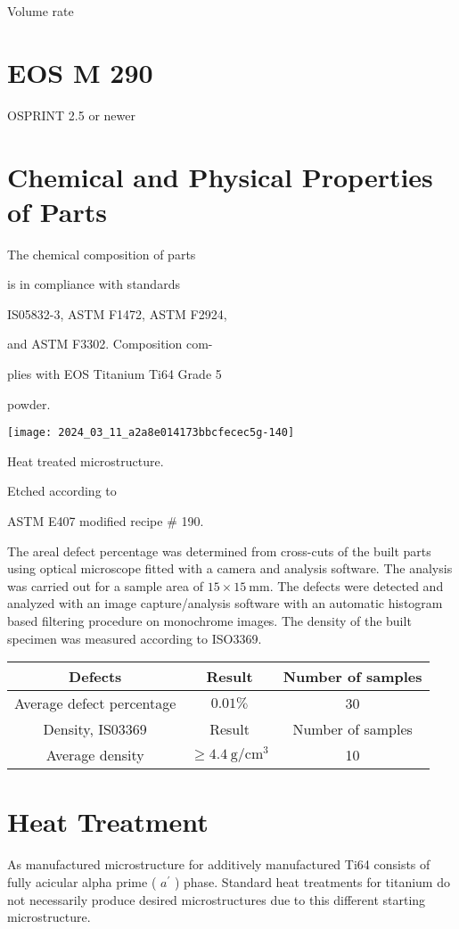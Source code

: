 \documentclass[10pt]{article}
\begin{document}
Volume rate

\section*{EOS M 290}
OSPRINT 2.5 or newer

\section*{Chemical and Physical Properties of Parts}
The chemical composition of parts

is in compliance with standards

IS05832-3, ASTM F1472, ASTM F2924,

and ASTM F3302. Composition com-

plies with EOS Titanium Ti64 Grade 5

powder.

\begin{center}
\texttt{[image: 2024\_03\_11\_a2a8e014173bbcfecec5g-140]}
\end{center}

Heat treated microstructure.

Etched according to

ASTM E407 modified recipe \# 190.

The areal defect percentage was determined from cross-cuts of the built parts using optical microscope fitted with a camera and analysis software. The analysis was carried out for a sample area of $15 \times 15 \mathrm{~mm}$. The defects were detected and analyzed with an image capture/analysis software with an automatic histogram based filtering procedure on monochrome images. The density of the built specimen was measured according to ISO3369.

\begin{center}
\begin{tabular}{|c|c|c|}
\hline
Defects & Result & Number of samples \\
\hline
Average defect percentage & $0.01 \%$ & 30 \\
\hline
Density, IS03369 & Result & Number of samples \\
\hline
Average density & $\geq 4.4 \mathrm{~g} / \mathrm{cm}^{3}$ & 10 \\
\hline
\end{tabular}
\end{center}

\section*{Heat Treatment}
As manufactured microstructure for additively manufactured Ti64 consists of fully acicular alpha prime ( $a^{\prime}$ ) phase. Standard heat treatments for titanium do not necessarily produce desired microstructures due to this different starting microstructure.
\end{document}

